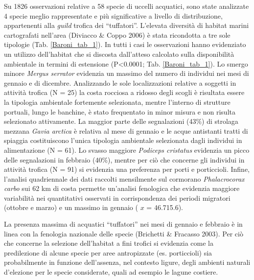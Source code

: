 Su 1826 osservazioni relative a 58 specie di uccelli acquatici, sono
state analizzate 4 specie meglio rappresentate e pi\`u significative a
livello di distribuzione, appartenenti alla \textit{guild} trofica dei
{\textquotedblleft}tuffatori{\textquotedblright}.
L{\textquoteright}elevata diversit\`a di habitat marini cartografati
nell{\textquoteright}area (Diviacco \& Coppo 2006) \`e stata ricondotta
a tre sole tipologie (Tab. \ref{Baroni_tab_1}). In tutti i casi le osservazioni hanno
evidenziato un utilizzo dell{\textquoteright}habitat che si discosta
dall{\textquoteright}atteso calcolato sulla disponibilit\`a ambientale
in termini di estensione (P{\textless}0.0001; Tab. \ref{Baroni_tab_1}). Lo smergo minore
\textit{Mergus serrator} evidenzia un massimo del numero di individui
nei mesi di gennaio e di dicembre. Analizzando le sole localizzazioni
relative a soggetti in attivit\`a trofica (N = 25) la costa rocciosa a
ridosso degli scogli \`e risultata essere la tipologia ambientale
fortemente selezionata, mentre l{\textquoteright}interno di strutture
portuali, lungo le banchine, \`e stato frequentato in minor misura e
non risulta selezionato attivamente. La maggior parte delle
segnalazioni (43\%) di strolaga mezzana \textit{Gavia arctica} \`e
relativa al mese di gennaio e le acque antistanti tratti di spiaggia
costituiscono l{\textquoteright}unica tipologia ambientale selezionata
dagli individui in alimentazione (N = 61). Lo svasso maggiore
\textit{Podiceps cristatus} evidenzia un picco delle segnalazioni in
febbraio (40\%), mentre per ci\`o che concerne gli individui in
attivit\`a trofica (N = 91) si evidenzia una preferenza per porti e
porticcioli. Infine, l{\textquoteright}analisi quadriennale dei dati
raccolti mensilmente sul cormorano \textit{Phalacrocorax carbo} sui 62
km di costa permette un{\textquoteright}analisi fenologica che
evidenzia maggiore variabilit\`a nei quantitativi osservati in
corrispondenza dei periodi migratori (ottobre e marzo) e un massimo in
gennaio ( ${x}$ = 46.7{\textpm}15.6).

La presenza massima di acquatici
{\textquotedblleft}tuffatori{\textquotedblright} nei mesi di gennaio e
febbraio \`e in linea con la fenologia nazionale delle specie
(Brichetti \& Fracasso 2003). Per ci\`o che concerne la selezione
dell{\textquoteright}habitat a fini trofici si evidenzia come la
predilezione di alcune specie per aree antropizzate (es. porticcioli)
sia probabilmente in funzione dell{\textquoteright}assenza, nel
contesto ligure, degli ambienti naturali d{\textquoteright}elezione per
le specie considerate, quali ad esempio le lagune costiere.



